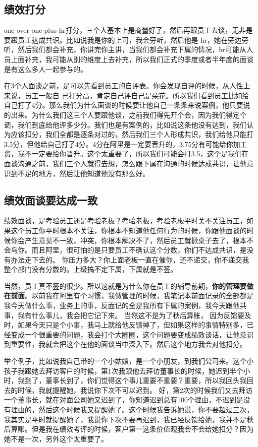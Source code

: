 \documentclass[12pt]{article}
\begin{document}
\subsection{绩效打分}
one over one plus hr打分，三个人基本上是商量好了，然后再跟员工去谈，无非是要跟员工达成共识。比如说我是你的上司，我会旁听，然后他是 hr，她在旁边旁听，然后我们都会补充，你讲完你主讲，当我们都会补充下属的情况，hr可能从人员上面补充，我可能从别的维度上去补充，所以我们正式的季度或者半年度的面谈是有这么多人一起参与的。

在3个人面谈之前，是可以先看到员工的自评表。你会发现自评的时候，从人性上来说，员工一般自 己打分高，肯定自己评自己是朵花。所以我们看到员工比如给自己打了4分。那么我们为什么面谈的时候要让他自己一条条来说案例，他只要说的出来。为什么我们这三个人要跟他谈，之前我们得先开个会，因为我们得定个调，我们到底给他评多少分。我们也是有案例的，比如说这条他没有达到，我们认为应该扣分，我们全都是逐条对过的，然后我们三个人形成共识，我们给他只能打3.5分，但他给自己打了4分。4分在阿里是一定要晋升的，3.75分有可能给你加工资，我不一定要给你晋升。这个太重要了，所以我们可能会打3.5，这个是我们在面谈沟通之前，我们三个人就得去想，怎么跟下属在沟通的时候达成共识，让他意识到不足的地方，然后让他知道他没有那么好。

\subsection{绩效面谈要达成一致}
绩效面谈，是考验员工还是考验老板？考验老板，考验老板平时关不关注员工，如果这个员工你平时根本不关注，你根本不知道他任何行为的时候，你跟他面谈的时候你会产生意见不一致，冲突，你根本解决不了，然后员工就掀桌子去了，根本不会鸟你。而且阿里，很可怕的是只要员工不确认这个分数，你们不达成共识，是没有办法走下去的。 你压力多大？你上面老板一直在催你，还不递交，你不递交我整个部门没有分数的。上级搞不定下属，下属就是不签。

当然，员工真不签的很少。所以这就是为什么你在员工的辅导前期，\textbf{你的管理要做在前面}。以前我在阿里有个习惯，我做管理的时候，我笔记本前面记录的全部都是我今天做什么事，业务上的事，反面记的全是我所有下属的案例，我今天跟他共事，我有什么事儿，我会把它记下来。 当然这不是为了秋后算账， 因为反馈要及时，如果今天只是个小事，我马上就给他反馈掉了，但如果这样的事情特别多，已经变成一个很重要的问题，我会打个大圈圈，这个问题要变成绩效谈话，让他意识到重要性，我就会把这个在他的面谈当中深入下。然后这个地方我会对他扣分。

举个例子，比如说我自己带的一个小姑娘，是一个小朋友，到我们公司来。这个小孩子我跟她去拜访客户的时候，第1次我跟他去拜访董事长的时候，她迟到半个小时，我到了，董事长到了，你们觉得这个事儿重要不重要？重要，所以我回头我回去的时候，我就提醒她，我说你下次不可以迟到。 好，第2次的时候我们又去拜访一个董事长，就在对面公司她又迟到了，你知道迟到总有100个理由，不迟到是没有理由的，然后这个时候我又提醒她了。这个时候我告诉她说，你不要超过三次，我其实是平时就提醒她了，我说你下次不要再迟到，我已经反馈给她，我并不是秋后算账。但是我在绩效考评的时候，客户第一这条价值观我会不会给她扣分？因为她不是一次，另外这个太重要了。
\end{document}
